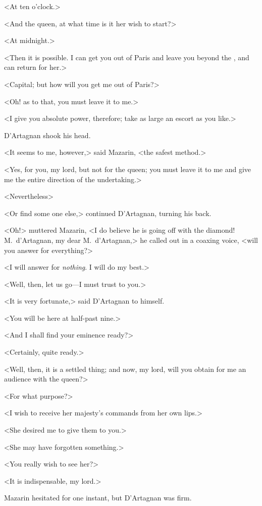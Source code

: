 <At ten o'clock.>

<And the queen, at what time is it her wish to start?>

<At midnight.>

<Then it is possible. I can get you out of Paris and leave you beyond the , and can return for her.>

<Capital; but how will you get me out of Paris?>

<Oh! as to that, you must leave it to me.>

<I give you absolute power, therefore; take as large an escort as you like.>

D'Artagnan shook his head.

<It seems to me, however,> said Mazarin, <the safest method.>

<Yes, for you, my lord, but not for the queen; you must leave it to me and give me the entire direction of the undertaking.>

<Nevertheless\longdash>

<Or find some one else,> continued D'Artagnan, turning his back.

<Oh!> muttered Mazarin, <I do believe he is going off with the diamond! M.~d'Artagnan, my dear M.~d'Artagnan,> he called out in a coaxing voice, <will you answer for everything?>

<I will answer for \emph{nothing}. I will do my best.>

<Well, then, let us go—I must trust to you.>

<It is very fortunate,> said D'Artagnan to himself.

<You will be here at half-past nine.>

<And I shall find your eminence ready?>

<Certainly, quite ready.>

<Well, then, it is a settled thing; and now, my lord, will you obtain for me an audience with the queen?>

<For what purpose?>

<I wish to receive her majesty's commands from her own lips.>

<She desired me to give them to you.>

<She may have forgotten something.>

<You really wish to see her?>

<It is indispensable, my lord.>

Mazarin hesitated for one instant, but D'Artagnan was firm.

